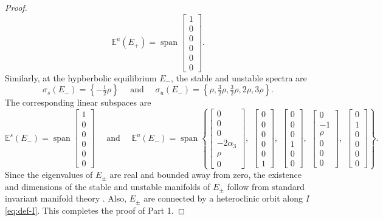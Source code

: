 \documentclass[11pt]{article}
\numberwithin{equation}{section}
\begin{document}
\begin{proof}
\[\mathbb E^u(E_+) = \operatorname{span} \begin{bmatrix} 1 \\ 0 \\ 0 \\ 0 \\ 0 \\ 0 \end{bmatrix}.
 \]
%
Similarly, at the hypberbolic equilibrium $E_-$, the stable and unstable spectra are 
%
\[ \sigma_s(E_-) = \left\{ -\tfrac{1}{2}\rho \right\} \quad  \text{ and } \quad \sigma_u(E_-) = \left\{ \rho,\tfrac{3}{2}\rho,\tfrac{3}{2}\rho,2\rho,3\rho \right\}. \] 
%
The corresponding linear subspaces are 
%
\[
\mathbb E^s (E_-) = \operatorname{span} \begin{bmatrix} 1 \\ 0 \\ 0 \\ 0 \\ 0 \\ 0 \end{bmatrix} 
\quad \text{ and } \quad 
\mathbb E^u(E_-) = 
\operatorname{span} \left\{  
\begin{bmatrix} 0 \\ 0 \\ 0 \\ -2 \alpha_3 \\ \rho \\ 0 \end{bmatrix}, \,\,
\begin{bmatrix} 0 \\ 0 \\ 0 \\ 0 \\ 0 \\ 1 \end{bmatrix}, \,\, 
\begin{bmatrix} 0 \\ 0 \\ 0 \\ 1 \\ 0 \\ 0 \end{bmatrix}, \,\, 
\begin{bmatrix} 0 \\ -1 \\ \rho \\ 0 \\ 0 \\ 0 \end{bmatrix}, \,\,
\begin{bmatrix} 0 \\ 1 \\ 0 \\ 0 \\ 0 \\ 0 \end{bmatrix}
\right\}.
\]
%
Since the eigenvalues of $E_{\pm}$ are real and bounded away from zero, the existence and dimensions of the stable and unstable manifolds of $E_{\pm}$ follow from standard invariant manifold theory \cite{HPS1977}. 
Also, $E_{\pm}$ are connected by a heteroclinic orbit along $I$ \eqref{eq:def-I}.
This completes the proof of Part 1.


\end{proof}
\end{document}
